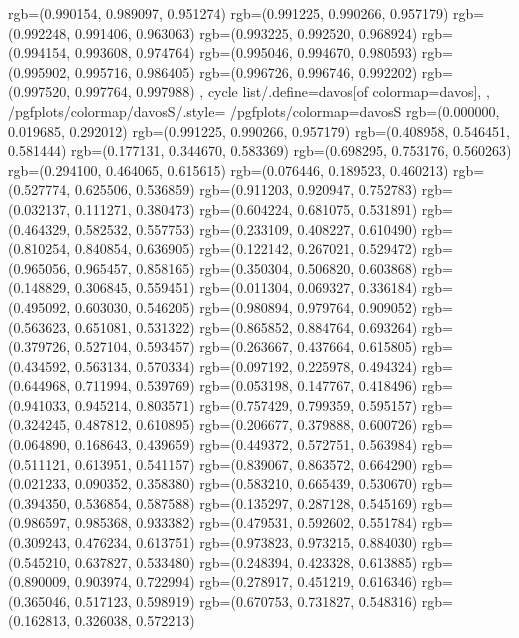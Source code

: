 {{{					rgb=(0.990154, 0.989097, 0.951274)
					rgb=(0.991225, 0.990266, 0.957179)
					rgb=(0.992248, 0.991406, 0.963063)
					rgb=(0.993225, 0.992520, 0.968924)
					rgb=(0.994154, 0.993608, 0.974764)
					rgb=(0.995046, 0.994670, 0.980593)
					rgb=(0.995902, 0.995716, 0.986405)
					rgb=(0.996726, 0.996746, 0.992202)
					rgb=(0.997520, 0.997764, 0.997988)
			},
		cycle list/.define={davos}{[of colormap=davos]},
		},
		/pgfplots/colormap/davosS/.style={
			/pgfplots/colormap={davosS}{%
					rgb=(0.000000, 0.019685, 0.292012)
					rgb=(0.991225, 0.990266, 0.957179)
					rgb=(0.408958, 0.546451, 0.581444)
					rgb=(0.177131, 0.344670, 0.583369)
					rgb=(0.698295, 0.753176, 0.560263)
					rgb=(0.294100, 0.464065, 0.615615)
					rgb=(0.076446, 0.189523, 0.460213)
					rgb=(0.527774, 0.625506, 0.536859)
					rgb=(0.911203, 0.920947, 0.752783)
					rgb=(0.032137, 0.111271, 0.380473)
					rgb=(0.604224, 0.681075, 0.531891)
					rgb=(0.464329, 0.582532, 0.557753)
					rgb=(0.233109, 0.408227, 0.610490)
					rgb=(0.810254, 0.840854, 0.636905)
					rgb=(0.122142, 0.267021, 0.529472)
					rgb=(0.965056, 0.965457, 0.858165)
					rgb=(0.350304, 0.506820, 0.603868)
					rgb=(0.148829, 0.306845, 0.559451)
					rgb=(0.011304, 0.069327, 0.336184)
					rgb=(0.495092, 0.603030, 0.546205)
					rgb=(0.980894, 0.979764, 0.909052)
					rgb=(0.563623, 0.651081, 0.531322)
					rgb=(0.865852, 0.884764, 0.693264)
					rgb=(0.379726, 0.527104, 0.593457)
					rgb=(0.263667, 0.437664, 0.615805)
					rgb=(0.434592, 0.563134, 0.570334)
					rgb=(0.097192, 0.225978, 0.494324)
					rgb=(0.644968, 0.711994, 0.539769)
					rgb=(0.053198, 0.147767, 0.418496)
					rgb=(0.941033, 0.945214, 0.803571)
					rgb=(0.757429, 0.799359, 0.595157)
					rgb=(0.324245, 0.487812, 0.610895)
					rgb=(0.206677, 0.379888, 0.600726)
					rgb=(0.064890, 0.168643, 0.439659)
					rgb=(0.449372, 0.572751, 0.563984)
					rgb=(0.511121, 0.613951, 0.541157)
					rgb=(0.839067, 0.863572, 0.664290)
					rgb=(0.021233, 0.090352, 0.358380)
					rgb=(0.583210, 0.665439, 0.530670)
					rgb=(0.394350, 0.536854, 0.587588)
					rgb=(0.135297, 0.287128, 0.545169)
					rgb=(0.986597, 0.985368, 0.933382)
					rgb=(0.479531, 0.592602, 0.551784)
					rgb=(0.309243, 0.476234, 0.613751)
					rgb=(0.973823, 0.973215, 0.884030)
					rgb=(0.545210, 0.637827, 0.533480)
					rgb=(0.248394, 0.423328, 0.613885)
					rgb=(0.890009, 0.903974, 0.722994)
					rgb=(0.278917, 0.451219, 0.616346)
					rgb=(0.365046, 0.517123, 0.598919)
					rgb=(0.670753, 0.731827, 0.548316)
					rgb=(0.162813, 0.326038, 0.572213)
}}}
